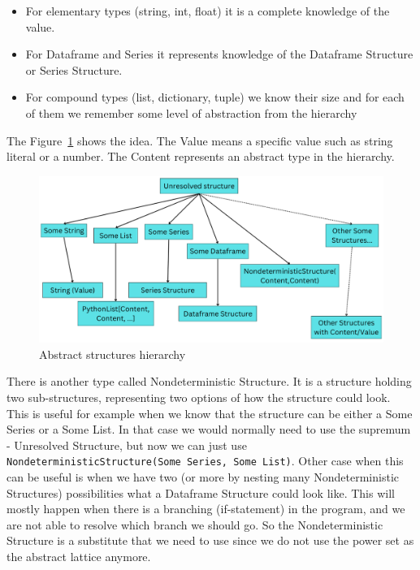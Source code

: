 \begin{itemize}
    \item For elementary types (string, int, float) it is a complete knowledge of the value.
    \item For Dataframe and Series it represents knowledge of the Dataframe Structure or Series Structure.
    \item For compound types (list, dictionary, tuple) we know their size and for each of them we remember some level
    of abstraction from the hierarchy
\end{itemize}

The Figure~\ref{fig:abstract_hierarchy} shows the idea.
The Value means a specific value such as string literal or a number.
The Content represents an abstract type in the hierarchy.

\begin{figure}[H]
    \caption{Abstract structures hierarchy}
    \label{fig:abstract_hierarchy}
    \centering
    \includegraphics[scale=0.5]{img/Hierarchy}
\end{figure}

There is another type called Nondeterministic Structure.
It is a structure holding two sub-structures, representing two options of how the structure could look.
This is useful for example when we know that the structure can be either a Some Series or a Some List.
In that case we would normally need to use the supremum - Unresolved Structure, but now we can just use
\verb|NondeterministicStructure(Some Series, Some List)|.
Other case when this can be useful is when we have two (or more by nesting many Nondeterministic Structures)
possibilities what a Dataframe Structure could look like.
This will mostly happen when there is a branching (if-statement) in the program, and we are not able to resolve
which branch we should go.
So the Nondeterministic Structure is a substitute that we need to use since we do not use the power set as the abstract
lattice anymore.


